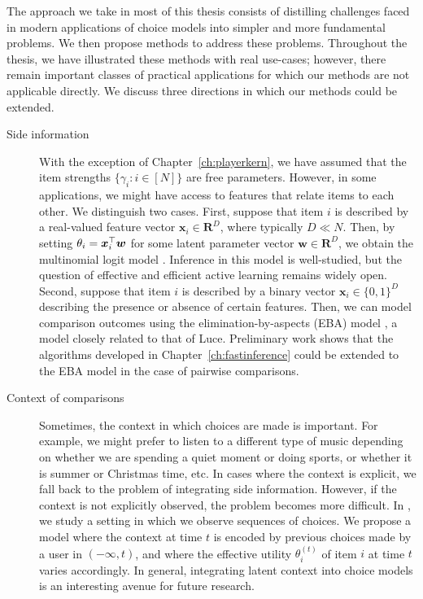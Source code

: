The approach we take in most of this thesis consists of distilling challenges faced in modern applications of choice models into simpler and more fundamental problems.
We then propose methods to address these problems.
Throughout the thesis, we have illustrated these methods with real use-cases; however, there remain important classes of practical applications for which our methods are not applicable directly.
We discuss three directions in which our methods could be extended.

\begin{description}
\item[Side information] With the exception of Chapter~\ref{ch:playerkern}, we have assumed that the item strengths $\{ \gamma_i : i \in [N] \}$ are free parameters.
However, in some applications, we might have access to features that relate items to each other.
We distinguish two cases.
First, suppose that item $i$ is described by a real-valued feature vector $\bm{x}_i \in \mathbf{R}^D$, where typically $D \ll N$.
Then, by setting $\theta_i = \bm{x}_i^\top \bm{w}$ for some latent parameter vector $\bm{w} \in \mathbf{R}^D$, we obtain the multinomial logit model \citep{mcfadden1973conditional, train2009discrete}.
Inference in this model is well-studied, but the question of effective and efficient active learning remains widely open.
Second, suppose that item $i$ is described by a binary vector $\bm{x}_i \in \{0, 1\}^D$ describing the presence or absence of certain features.
Then, we can model comparison outcomes using the elimination-by-aspects (EBA) model \citep{tversky1972elimination}, a model closely related to that of Luce.
Preliminary work shows that the algorithms developed in Chapter~\ref{ch:fastinference} could be extended to the EBA model in the case of pairwise comparisons.

\item[Context of comparisons] Sometimes, the context in which choices are made is important.
For example, we might prefer to listen to a different type of music depending on whether we are spending a quiet moment or doing sports, or whether it is summer or Christmas time, etc.
In cases where the context is explicit, we fall back to the problem of integrating side information.
However, if the context is not explicitly observed, the problem becomes more difficult.
In \citet{ko2016collaborative}, we study a setting in which we observe sequences of choices.
We propose a model where the context at time $t$ is encoded by previous choices made by a user in $(-\infty, t)$, and where the effective utility $\theta_i^{(t)}$ of item $i$ at time $t$ varies accordingly.
In general, integrating latent context into choice models is an interesting avenue for future research.


\end{description}
